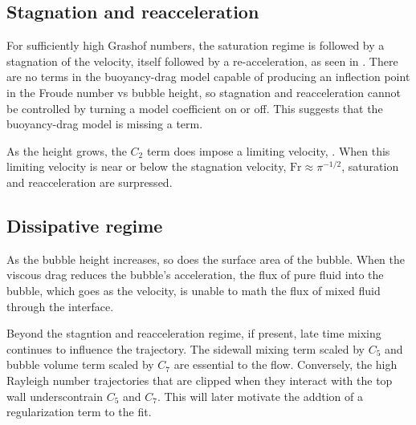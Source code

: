 \subsection{Stagnation and reacceleration}

For sufficiently high Grashof numbers, the saturation regime is followed by a stagnation of the velocity, itself followed by a re-acceleration, as seen in .
There are no terms in the buoyancy-drag model capable of producing an inflection point in the Froude number vs bubble height, so stagnation and reacceleration cannot be controlled by turning a model coefficient on or off.
This suggests that the buoyancy-drag model is missing a term.

As the height grows, the $C_2$ term does impose a limiting velocity, .
When this limiting velocity is near or below the stagnation velocity, $\text{Fr} \approx \pi^{-1/2}$, saturation and reacceleration are surpressed.


\subsection{Dissipative regime}

As the bubble height increases, so does the surface area of the bubble.
When the viscous drag reduces the bubble's acceleration, the flux of pure fluid into the bubble, which goes as the velocity, is unable to math the flux of mixed fluid through the interface.

Beyond the stagntion and reacceleration regime, if present, late time mixing continues to influence the trajectory.
The sidewall mixing term scaled by $C_5$ and bubble volume term scaled by $C_7$ are essential to the flow.
Conversely, the high Rayleigh number trajectories that are clipped when they interact with the top wall underscontrain $C_5$ and $C_7$.
This will later motivate the addtion of a regularization term to the fit.

